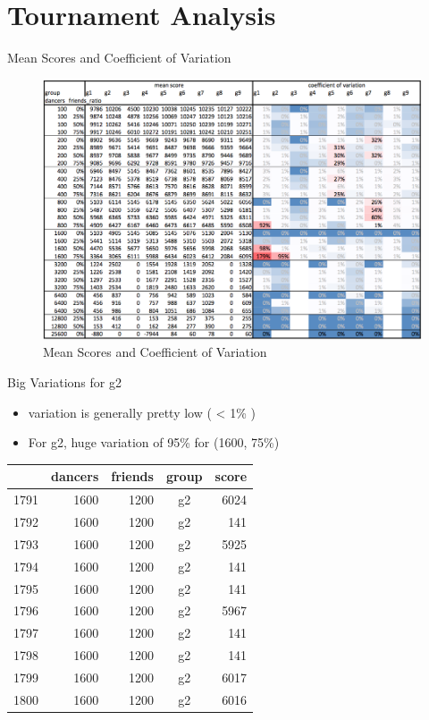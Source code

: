 \section{Tournament Analysis}\label{tournament-analysis}

\begin{frame}{Mean Scores and Coefficient of Variation}

\begin{figure}[htbp]
\centering
\includegraphics{imgs/mean-cov.png}
\caption{Mean Scores and Coefficient of Variation\label{img-mean-cov}}
\end{figure}

\end{frame}

\begin{frame}{Big Variations for g2}

\begin{itemize}
\tightlist
\item
  variation is generally pretty low ( \textless{} 1\% )
\item
  For g2, huge variation of 95\% for (1600, 75\%)
\end{itemize}

\begin{longtable}[c]{@{}lrrcr@{}}
\toprule
& dancers & friends & group & score\tabularnewline
\midrule
\endhead
1791 & 1600 & 1200 & g2 & 6024\tabularnewline
1792 & 1600 & 1200 & g2 & 141\tabularnewline
1793 & 1600 & 1200 & g2 & 5925\tabularnewline
1794 & 1600 & 1200 & g2 & 141\tabularnewline
1795 & 1600 & 1200 & g2 & 141\tabularnewline
1796 & 1600 & 1200 & g2 & 5967\tabularnewline
1797 & 1600 & 1200 & g2 & 141\tabularnewline
1798 & 1600 & 1200 & g2 & 141\tabularnewline
1799 & 1600 & 1200 & g2 & 6017\tabularnewline
1800 & 1600 & 1200 & g2 & 6016\tabularnewline
\bottomrule
\end{longtable}

\end{frame}

